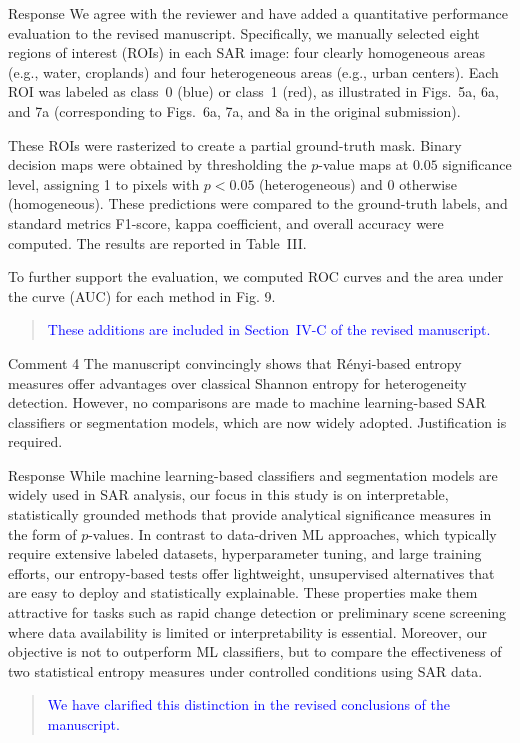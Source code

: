 \documentclass[11pt]{report}
\begin{document}
\begin{responsebox}{Response}
We agree with the reviewer and have added a quantitative performance evaluation to the revised manuscript. Specifically, we manually selected eight regions of interest (ROIs) in each SAR image: four clearly homogeneous areas (e.g., water, croplands) and four heterogeneous areas (e.g., urban centers). Each ROI was labeled as class~0 (blue) or class~1 (red), as illustrated in Figs.~5a, 6a, and 7a (corresponding to Figs.~6a, 7a, and 8a in the original submission).

These ROIs were rasterized to create a partial ground-truth mask. Binary decision maps were obtained by thresholding the $p$-value maps at $ 0.05$ significance level, assigning 1 to pixels with $p < 0.05$ (heterogeneous) and 0 otherwise (homogeneous). These predictions were compared to the ground-truth labels, and standard metrics F1-score, kappa coefficient, and overall accuracy were computed. The results are reported in Table~III.

To further support the evaluation, we computed ROC curves and the area under the curve (AUC) for each method in Fig. 9.

\begin{quote}
\textcolor{blue}{These additions are included in Section~IV-C of the revised manuscript. }
\end{quote}

\end{responsebox}



\begin{reviewbox}{Comment 4}
The manuscript convincingly shows that Rényi-based entropy measures offer advantages over classical Shannon entropy for heterogeneity detection. However, no comparisons are made to machine learning-based SAR classifiers or segmentation models, which are now widely adopted. Justification is required.
\end{reviewbox}
\begin{responsebox}{Response}
While machine learning-based classifiers and segmentation models are widely used in SAR analysis, our focus in this study is on interpretable, statistically grounded methods that provide analytical significance measures in the form of $p$-values. 
 In contrast to data-driven ML approaches, which typically require extensive labeled datasets, hyperparameter tuning, and large training efforts, our entropy-based tests offer lightweight, unsupervised alternatives that are easy to deploy and statistically explainable. These properties make them attractive for tasks such as rapid change detection or preliminary scene screening where data availability is limited or interpretability is essential. Moreover, our objective is not to outperform ML classifiers, but to compare the effectiveness of two statistical entropy measures under controlled conditions using SAR data.
\begin{quote}
\textcolor{blue}{We have clarified this distinction in the revised conclusions of the manuscript.}
\end{quote}
\end{responsebox}
\end{document}
